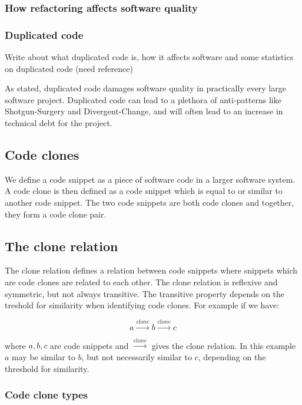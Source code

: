 \documentclass[12pt]{article}
\begin{document}
\subsubsection{How refactoring affects software quality}

\subsubsection{Duplicated code}

Write about what duplicated code is, how it affects software and some statistics on
duplicated code (need reference)

As stated, duplicated code damages software quality in practically every large software
project. Duplicated code can lead to a plethora of anti-patterns like Shotgun-Surgery and
Divergent-Change, and will often lead to an increase in technical debt for the
project.\cite[99]{fowlerrefactoring}

\subsection{Code clones}

We define a code snippet as a piece of software code in a larger software system. A code
clone is then defined as a code snippet which is equal to or similar to another code
snippet. The two code snippets are both code clones and together, they form a code clone
pair. 

\subsection{The clone relation}
The clone relation defines a relation between code snippets where snippets which are
code clones are related to each other. The clone relation is reflexive and symmetric, but
not always transitive. The transitive property depends on the treshold for similarity when
identifying code clones. For example if we have:

$$a \xrightarrow{clone} b \xrightarrow{clone} c$$

where $a,b,c$ are code snippets and $\xrightarrow{clone}$ gives the clone relation. In
this example $a$ may be similar to $b$, but not necessarily similar to $c$, depending on
the threshold for similarity.

\subsubsection{Code clone types}
\end{document}
